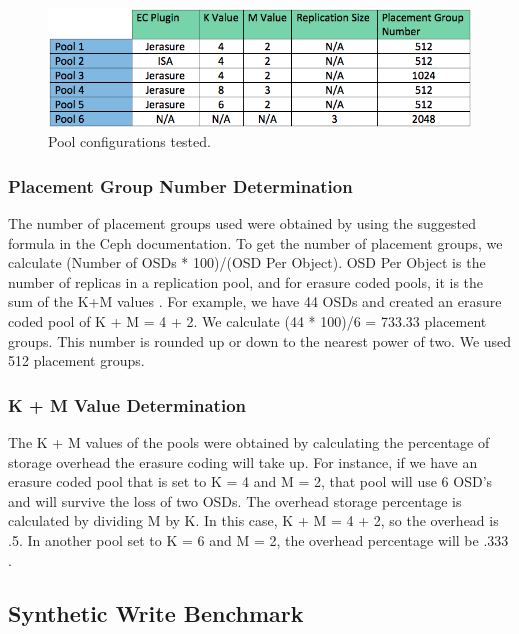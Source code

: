 \documentclass[conference,compsoc]{IEEEtran}
\begin{document}
\begin{figure}

\includegraphics[width=\linewidth]{PoolConfigurations.png}
\caption{Pool configurations tested.}
\label{fig:Configurations}

\end{figure}

\subsubsection{Placement Group Number Determination}
The number of placement groups used were obtained by using the suggested formula in the Ceph documentation. To get the number of placement groups, we calculate (Number of OSDs * 100)/(OSD Per Object). OSD Per Object is the number of replicas in a replication pool, and for erasure coded pools, it is the sum of the K+M values \cite{maltzahn2010ceph}. For example, we have 44 OSDs and created an erasure coded pool of K + M = 4 + 2. We calculate (44 * 100)/6 = 733.33 placement groups. This number is rounded up or down to the nearest power of two. We used 512 placement groups.

\subsubsection{K + M Value Determination}

The K + M values of the pools were obtained by calculating the percentage of storage overhead the erasure coding will take up. For instance, if we have an erasure coded pool that is set to K = 4 and M = 2, that pool will use 6 OSD’s and will survive the loss of two OSDs. The overhead storage percentage is calculated by dividing M by K. In this case, K + M = 4 + 2, so the overhead is .5. In another pool set to K = 6 and M = 2, the overhead percentage will be .333 \cite{greenan2007disaster}.  

\subsection{Synthetic Write Benchmark}
\end{document}
